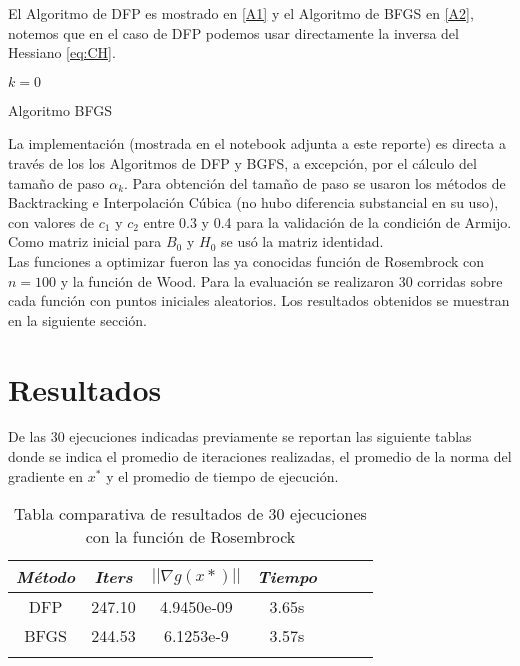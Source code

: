 \documentclass[conference]{IEEEtran}
\begin{document}
El Algoritmo de DFP es mostrado en \ref{A1} y el Algoritmo de BFGS en \ref{A2}, notemos que en
el caso de DFP podemos usar directamente la inversa del Hessiano \ref{eq:CH}.

\begin{algorithm}[h]
    \SetAlgoLined
	$k=0$ \\
    \caption{Algoritmo BFGS}
    \label{A2}
\end{algorithm}

La implementación (mostrada en el notebook adjunta a este reporte) es directa a través de los los
Algoritmos de DFP y BGFS, a excepción, por el cálculo del tamaño de paso
$\alpha_k$. Para obtención del tamaño de paso se usaron los métodos de Backtracking e Interpolación
Cúbica (no hubo diferencia substancial en su uso), con valores de $c_1$ y $c_2$ entre
0.3 y 0.4 para la validación de la condición de Armijo. Como matriz inicial para $B_0$ y $H_0$ se
usó la matriz identidad. \\

Las funciones a optimizar fueron las ya conocidas función de Rosembrock con $n=100$ y la función de
Wood. Para la evaluación se realizaron 30 corridas sobre cada función con puntos iniciales
aleatorios. Los resultados obtenidos se muestran en la siguiente sección.

\section{Resultados}

De las 30 ejecuciones indicadas previamente se reportan las siguiente tablas donde se indica el
promedio de iteraciones realizadas, el promedio de la norma del gradiente en $x^*$ y el promedio de
tiempo de ejecución.

\begin{table}[htbp]
    \caption{Tabla comparativa de resultados de 30 ejecuciones con la función de Rosembrock}
    \begin{center}
        \begin{tabular}{|c|c|c|c|c|c|c|}
            \hline
			\textbf{\textit{Método}}& \textbf{\textit{Iters}}& \textbf{\textit{$||\nabla g(x*)||$}}& \textbf{\textit{Tiempo}} \\
            \hline
            DFP  & 247.10 & 4.9450e-09 & 3.65s \\
            BFGS & 244.53 & 6.1253e-9 & 3.57s \\
            \hline
            \multicolumn{4}{l}{}
        \end{tabular}
        \label{tab1}
    \end{center}
\end{table}
\end{document}
